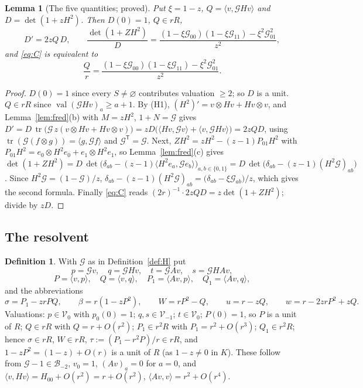 \documentclass[11pt]{article}
\newtheorem{lemma}[theorem]{Lemma}
\theoremstyle{definition}
\newtheorem{definition}[theorem]{Definition}
\theoremstyle{remark}
\newcommand{\tr}{\operatorname{tr}}
\begin{document}
\begin{lemma}[The five quantities; proved]\label{lem:five}
Put $\xi=1-z$, $Q=\langle v,\mathcal GHv\rangle$ and $D=\det(1+zH^2)$. Then $D(0)=1$, $Q\in rR$,
\begin{equation}\label{eq:dlogdet}
D'=2zQ\,D,\qquad
\frac{\det(1+ZH^2)}{D}=\frac{(1-\xi\mathcal G_{00})(1-\xi\mathcal G_{11})-\xi^2\mathcal G_{01}^2}{z^2},
\end{equation}
and \eqref{eq:C} is equivalent to
\begin{equation}\label{eq:Cprime}
\frac{Q}{r}=\frac{(1-\xi\mathcal G_{00})(1-\xi\mathcal G_{11})-\xi^2\mathcal G_{01}^2}{z^2}.\tag{C$'$}
\end{equation}
\end{lemma}

\begin{proof}
$D(0)=1$ since every $S\ne\varnothing$ contributes valuation $\ge2$; so $D$ is a unit. $Q\in rR$ since $\operatorname{val}(\mathcal GHv)_a\ge a+1$. By (H1), $(H^2)'=v\otimes Hv+Hv\otimes v$, and Lemma~\ref{lem:fred}(b) with $M=zH^2$, $1+N=\mathcal G$ gives $D'=D\,\tr\bigl(\mathcal G\,z(v\otimes Hv+Hv\otimes v)\bigr)=zD\bigl(\langle Hv,\mathcal Gv\rangle+\langle v,\mathcal GHv\rangle\bigr)=2zQD$, using $\tr(\mathcal G(f\otimes g))=\langle g,\mathcal Gf\rangle$ and $\mathcal G^{\mathsf T}=\mathcal G$. Next, $ZH^2=zH^2-(z-1)P_{01}H^2$ with $P_{01}H^2=e_0\otimes H^2e_0+e_1\otimes H^2e_1$, so Lemma~\ref{lem:fred}(c) gives $\det(1+ZH^2)=D\,\det\bigl(\delta_{ab}-(z-1)\langle H^2e_a,\mathcal Ge_b\rangle\bigr)_{a,b\in\{0,1\}}=D\,\det\bigl(\delta_{ab}-(z-1)(H^2\mathcal G)_{ab}\bigr)$. Since $H^2\mathcal G=(1-\mathcal G)/z$, $\delta_{ab}-(z-1)(H^2\mathcal G)_{ab}=\bigl(\delta_{ab}-\xi\mathcal G_{ab}\bigr)/z$, which gives the second formula. Finally \eqref{eq:C} reads $(2r)^{-1}\cdot2zQD=z\det(1+ZH^2)$; divide by $zD$.
\end{proof}

\subsection{The resolvent}

\begin{definition}\label{def:pq}
With $\mathcal G$ as in Definition~\ref{def:H} put
\[
p=\mathcal Gv,\quad q=\mathcal GHv,\quad t=\mathcal GAv,\quad s=\mathcal GHAv,
\]
\[
P=\langle v,p\rangle,\quad Q=\langle v,q\rangle,\quad P_1=\langle Av,p\rangle,\quad Q_1=\langle Av,q\rangle,
\]
and the abbreviations
\[
\sigma=P_1-zrPQ,\qquad \beta=r(1-zP^2),\qquad W=rP^2-Q,\qquad u=r-zQ,\qquad w=r-2zrP^2+zQ .
\]
Valuations: $p\in\mathcal V_0$ with $p_0(0)=1$; $q,s\in\mathcal V_{-1}$; $t\in\mathcal V_0$; $P(0)=1$, so $P$ is a unit of $R$; $Q\in rR$ with $Q=r+O(r^2)$; $P_1\in r^2R$ with $P_1=r^2+O(r^3)$; $Q_1\in r^2R$; hence $\sigma\in rR$, $W\in rR$, $\tau:=(P_1-r^2P)/r\in rR$, and $1-zP^2=(1-z)+O(r)$ is a unit of $R$ (as $1-z\ne0$ in $K$). These follow from $\mathcal G-1\in\mathcal B_{-2}$, $v_0=1$, $(Av)_a=0$ for $a=0$, and $\langle v,Hv\rangle=H_{00}+O(r^2)=r+O(r^2)$, $\langle Av,v\rangle=r^2+O(r^4)$.
\end{definition}
\end{document}
